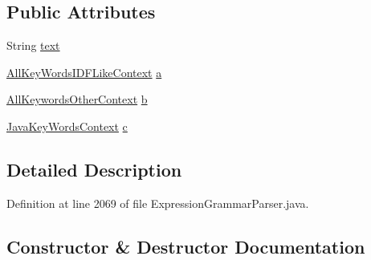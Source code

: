 \subsection*{Public Attributes}
\begin{DoxyCompactItemize}
\item 
String \hyperlink{classgov_1_1nasa_1_1jpf_1_1inspector_1_1server_1_1expression_1_1parser_1_1_expression_grammar_parser_1_1_all_key_words_context_ad1cc040f529e9b4d5a9695850c7548ef}{text}
\item 
\hyperlink{classgov_1_1nasa_1_1jpf_1_1inspector_1_1server_1_1expression_1_1parser_1_1_expression_grammar_pad664d42a2aee14226e172b869b9ffb3b}{All\+Key\+Words\+I\+D\+F\+Like\+Context} \hyperlink{classgov_1_1nasa_1_1jpf_1_1inspector_1_1server_1_1expression_1_1parser_1_1_expression_grammar_parser_1_1_all_key_words_context_a25c6288f57a4c904a0f5c0725538a0fd}{a}
\item 
\hyperlink{classgov_1_1nasa_1_1jpf_1_1inspector_1_1server_1_1expression_1_1parser_1_1_expression_grammar_pacb3381aaee949f84c436ba6b73657885}{All\+Keywords\+Other\+Context} \hyperlink{classgov_1_1nasa_1_1jpf_1_1inspector_1_1server_1_1expression_1_1parser_1_1_expression_grammar_parser_1_1_all_key_words_context_a6e2adaf635eb4e277ab5d1b213cefcc1}{b}
\item 
\hyperlink{classgov_1_1nasa_1_1jpf_1_1inspector_1_1server_1_1expression_1_1parser_1_1_expression_grammar_parser_1_1_java_key_words_context}{Java\+Key\+Words\+Context} \hyperlink{classgov_1_1nasa_1_1jpf_1_1inspector_1_1server_1_1expression_1_1parser_1_1_expression_grammar_parser_1_1_all_key_words_context_aba54779255d53588d586fe041afe3ab2}{c}
\end{DoxyCompactItemize}


\subsection{Detailed Description}


Definition at line 2069 of file Expression\+Grammar\+Parser.\+java.



\subsection{Constructor \& Destructor Documentation}
